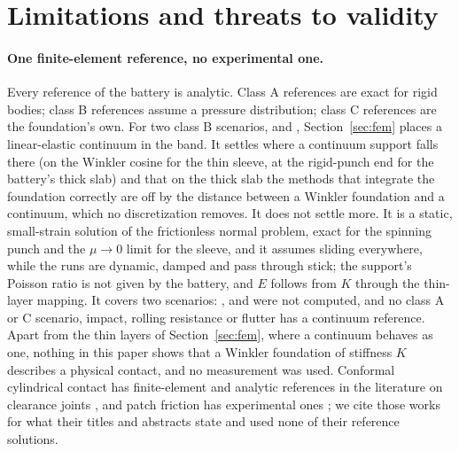 \section{Limitations and threats to validity}\label{sec:limitations}


\paragraph{One finite-element reference, no experimental one.} Every reference of the battery
is analytic. Class A references are exact for rigid bodies; class B references assume a
pressure distribution; class C references are the foundation's own. For two class B scenarios,
 and , Section~\ref{sec:fem} places a linear-elastic continuum in the
band. It settles where a continuum support falls there (on the Winkler cosine for the thin
sleeve, at the rigid-punch end for the battery's thick slab) and that on the thick slab the
methods that integrate the foundation correctly are off by the distance between a Winkler
foundation and a continuum, which no discretization removes. It does not settle more. It is a
static, small-strain solution of the frictionless normal problem, exact for the spinning punch
and the $\mu\to0$ limit for the sleeve, and it assumes sliding everywhere, while the runs are
dynamic, damped and pass through stick; the support's Poisson ratio is not given by the
battery, and $E$ follows from $K$ through the thin-layer mapping. It covers two scenarios:
,  and  were not computed, and no class A or C scenario,
impact, rolling resistance or flutter has a continuum reference. Apart from the thin layers of
Section~\ref{sec:fem}, where a continuum behaves as one, nothing in this paper shows that a
Winkler foundation of stiffness $K$ describes a physical contact, and no measurement was used. Conformal cylindrical contact has finite-element and analytic references in the
literature on clearance joints \cite{Liu2007,Pereira2011,Pereira2015}, and patch friction has
experimental ones \cite{Kudra2015}; we cite those works for what their titles and abstracts
state and used none of their reference solutions.

